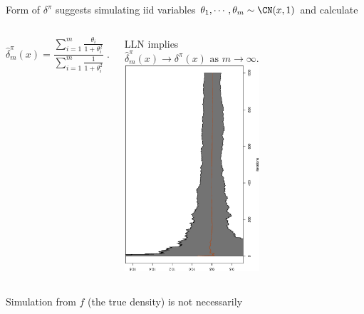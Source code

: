 \begin{slide}
\end{slide}\begin{slide}
Form of $\delta^\pi$ suggests simulating iid variables 
$\theta_1, \cdots, \theta_m \sim \CN (x,1)$ and calculate
\begin{columns}
\begin{displaymath}
 \hat{\delta}^\pi_m(x)=\frac{\sum_{i=1}^m 
\displaystyle{\frac{\theta_i}{1+\theta_i^2}}}{\sum_{i=1}^m 
\displaystyle{\frac{1}{1+\theta_i^2}}}  \;.
\end{displaymath}

\pause
LLN implies
$$\hat{\delta}^\pi_m(x) \longrightarrow 
\delta^\pi(x)\mbox{ as } m \longrightarrow \infty.$$ 
\includegraphics[height=\textwidth,width=5cm,angle=270]{figures/rangeofco.ps}
\end{columns}\fin

\end{slide}\begin{slide}

Simulation from $f$ (the true density) is not necessarily {}


\end{slide}
